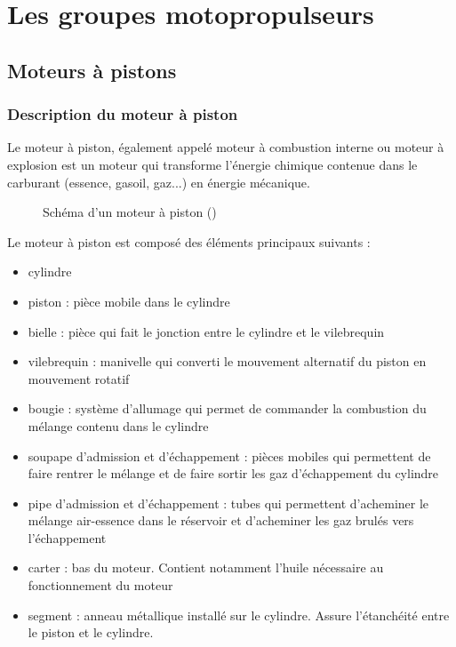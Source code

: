 

\section{Les groupes motopropulseurs}

	\subsection{Moteurs à pistons}
		\subsubsection{Description du moteur à piston}
		Le moteur à piston, également appelé moteur à combustion interne ou moteur à explosion est un moteur qui transforme l'énergie chimique contenue dans le carburant (essence, gasoil, gaz...) en énergie mécanique.
		\begin{figure}[H]
  		\centering
    		
  		\caption{Schéma d'un moteur à piston (\cite{tikz::schemaMoteurPiston})}
		\end{figure}
		
		Le moteur à piston est composé des éléments principaux suivants :
		\begin{itemize}
			\item cylindre
			\item piston : pièce mobile dans le cylindre
			\item bielle : pièce qui fait le jonction entre le cylindre et le vilebrequin
			\item vilebrequin : manivelle qui converti le mouvement alternatif du piston en mouvement rotatif
			\item bougie : système d'allumage qui permet de commander la combustion du mélange contenu dans le cylindre
			\item soupape d'admission et d'échappement : pièces mobiles qui permettent de faire rentrer le mélange et de faire sortir les gaz d'échappement du cylindre 
			\item pipe d'admission et d'échappement : tubes qui permettent d'acheminer le mélange air-essence dans le réservoir et d'acheminer les gaz brulés vers l'échappement
			\item carter : bas du moteur. Contient notamment l'huile nécessaire au fonctionnement du moteur
			\item segment : anneau métallique installé sur le cylindre. Assure l'étanchéité entre le piston et le cylindre.
		\end{itemize}
	
